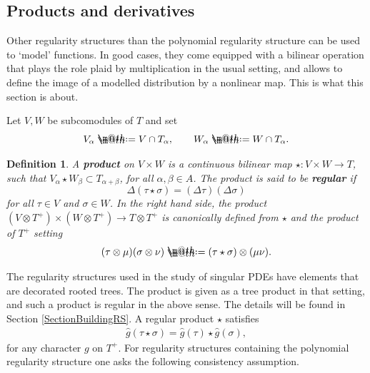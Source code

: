 \documentclass[10pt, reqno]{amsart}
\makeatletter
\numberwithin{subsection}{section}
\numberwithin{subsubsection}{subsection}
\numberwithin{equation}{section} %
\theoremstyle{mystyle}
\theoremstyle{mystyle2}
\newtheorem*{defn*} {Definition}
\theoremstyle{mystyle3}
\newcommand{\ssk}{\smallskip}
\newcommand*{\defeq}{\mathrel{\rlap{%
                     \raisebox{0.3ex}{$\m@th\cdot$}}%
                     \raisebox{-0.3ex}{$\m@th\cdot$}}%
                     =}
\makeatother
\begin{document}
\bigskip


\subsection{Products and derivatives}
\label{section products and derivatives}

Other regularity structures than the polynomial regularity structure can be used to `model' functions. In good cases, they come equipped with a bilinear operation that plays the role plaid by multiplication in the usual 
setting, and allows to define the image of a modelled distribution by a nonlinear map. This is what this section is about.   

\ssk

Let $V,W$ be subcomodules of $T$ and set 
$$
V_\alpha\defeq V\cap T_\alpha,\qquad W_\alpha\defeq W\cap T_\alpha.
$$

\medskip

\begin{defn*}
A \textbf{\textsf{product}} on $V\times W$ is a continuous bilinear map $\star : V\times W\rightarrow T$, such that $V_\alpha\star W_\beta \subset 
T_{\alpha+\beta}$, for all $\alpha,\beta\in A$. 
The product is said to be \textbf{\textsf{regular}} if
$$
\Delta(\tau\star\sigma)=(\Delta\tau)(\Delta\sigma)
$$
for all $\tau\in V$ and $\sigma\in W$. In the right hand side, the product $(V\otimes T^+)\times (W\otimes T^+)\to T\otimes T^+$ is canonically defined from $\star$ and the product of $T^+$ setting 
$$
(\tau\otimes\mu)(\sigma\otimes\nu) \defeq (\tau\star\sigma)\otimes(\mu\nu).
$$   
\end{defn*}

\medskip

The regularity structures used in the study of singular PDEs have elements that are decorated rooted trees. The product is given as a tree product 
in that setting, and such a product is regular in the above sense. The details will be found in Section \ref{SectionBuildingRS}. A regular product 
$\star$ satisfies   
\begin{align}\label{section2: consequence of regularity of product}
\widehat{g}(\tau\star\sigma) = \widehat{g}(\tau)\star\widehat{g}(\sigma),
\end{align}
for any character $g$ on $T^+$. For regularity structures containing the polynomial regularity structure one asks the following consistency assumption.   

\medskip
\end{document}
